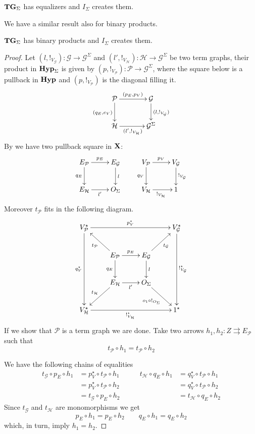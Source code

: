 \documentclass[runningheads,envcountsect]{llncs}
\def\X{\textbf {\textup{X}}}
\newcommand{\catname}[1]{\textbf{\textup{#1}}}
\newcommand{\hyp}{\catname{Hyp}}
\newcommand{\tg}[0]{\catname{TG}_{\Sigma}}
\begin{document}
\begin{proposition}\label{prop:equ}$\tg$ has equalizers and $I_{\Sigma}$ creates them.
\end{proposition}

We have a similar result also for binary products.

\begin{proposition} $\tg$ has binary products and $I_\Sigma$ creates them.
\end{proposition}
\begin{proof}
	Let $(l, !_{V_\mathcal{G}})\colon \mathcal{G}\to \mathcal{G}^{\Sigma}$ and $(l', !_{V_\mathcal{H}})\colon \mathcal{H}\to \mathcal{G}^{\Sigma}$ be two term graphs, their product in $\hyp_{\Sigma}$ is given by $(p, !_{V_\mathcal{P}})\colon \mathcal{P}\to \mathcal{G}^{\Sigma}$, where the square below  is a pullback in $\hyp$ and $(p, !_{V_\mathcal{P}})$ is the diagonal filling it.
	\[\xymatrix@C=35pt{\mathcal{P} \ar[r]^{(p_E, p_V)} \ar[d]_{(q_E, e_V)} & \mathcal{G} \ar[d]^{(l, !_{V_\mathcal{G}})}\\ \mathcal{H} \ar[r]_{(l', !_{V_{\mathcal{H}}})}& \mathcal{G}^\Sigma}\]
	By  we have two pullback square in $\X$:
	\[\xymatrix{E_\mathcal{P} \ar[r]^{p_E} \ar[d]_{q_E} & E_\mathcal{G} \ar[d]^{l} &V_{\mathcal{P}} \ar[r]^{p_V} \ar[d]_{q_V}&V_{\mathcal{G}}\ar[d]^{!_{V_\mathcal{G}}} \\ E_\mathcal{H} \ar[r]_{l'}& O_\Sigma & V_\mathcal{H}\ar[r]_{!_{V_\mathcal{H}}} & 1}\]
	Moreover $t_{\mathcal{P}}$ fits in the following diagram.
	\[\xymatrix{V^\star_{\mathcal{P}} \ar[rrr]^{p^\star_V} \ar[ddd]_{q^\star_V}& & &V_{\mathcal{G}}^\star \ar[ddd]^{!^\star_{V_\mathcal{G}}}\\&E_\mathcal{P} \ar[ul]^{t_{\mathcal{P}}}\ar[r]^{p_E} \ar[d]_{q_E} & E_\mathcal{G} \ar[ur]_{t_{\mathcal{G}}} \ar[d]^{l}  \\ &E_\mathcal{H} \ar[dl]_{t_{\mathcal{H}}} \ar[r]_{l'}& O_\Sigma \ar[dr]_{o_1\circ !_{O_\Sigma}} \\V^\star_{\mathcal{H}} \ar[rrr]_{!^\star_{V_\mathcal{H}}}& & &1^\star}\]
	If we show that $\mathcal{P}$ is a term graph we are done. Take two arrows $h_1, h_{2}\colon Z\rightrightarrows  E_{\mathcal{P}}$ such that 
	\[t_{\mathcal{P}}\circ h_1= t_{\mathcal{P}}\circ h_2 \]
	
	We have the following chains of equalities 
	\[\begin{split}
		t_{\mathcal{G}}\circ p_E \circ h_1&=p^\star_V\circ t_{\mathcal{P}} \circ h_1 \\&=p^\star_V\circ t_{\mathcal{P}}\circ h_2\\&=t_{\mathcal{G}}\circ p_E\circ h_2
	\end{split} \qquad \begin{split}
		t_{\mathcal{H}}\circ q_E\circ h_1&=q^\star_V\circ t_{\mathcal{P}} \circ h_1\\&=q^\star_V\circ t_{\mathcal{P}}\circ h_2\\&=t_{\mathcal{H}} \circ q_E\circ h_2
	\end{split}\]
	Since $t_{\mathcal{G}}$ and $t_{\mathcal{H}}$ are monomorphisms we get
	\[p_E \circ h_1=p_E\circ h_2 \qquad q_E\circ h_1=q_E \circ h_2\]
	which, in turn, imply  $h_1=h_2$.	
\end{proof}
\end{document}
